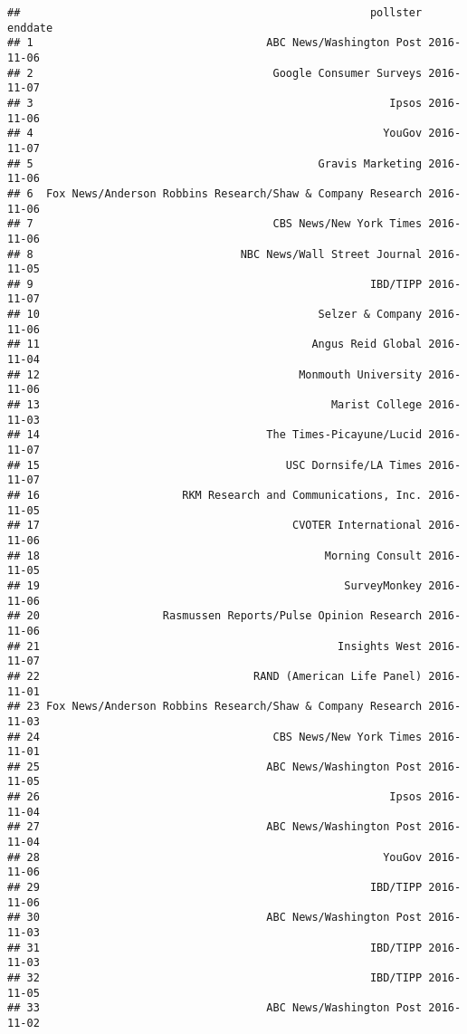 \documentclass[]{article}
\begin{document}
\begin{verbatim}
##                                                      pollster    enddate
## 1                                    ABC News/Washington Post 2016-11-06
## 2                                     Google Consumer Surveys 2016-11-07
## 3                                                       Ipsos 2016-11-06
## 4                                                      YouGov 2016-11-07
## 5                                            Gravis Marketing 2016-11-06
## 6  Fox News/Anderson Robbins Research/Shaw & Company Research 2016-11-06
## 7                                     CBS News/New York Times 2016-11-06
## 8                                NBC News/Wall Street Journal 2016-11-05
## 9                                                    IBD/TIPP 2016-11-07
## 10                                           Selzer & Company 2016-11-06
## 11                                          Angus Reid Global 2016-11-04
## 12                                        Monmouth University 2016-11-06
## 13                                             Marist College 2016-11-03
## 14                                   The Times-Picayune/Lucid 2016-11-07
## 15                                      USC Dornsife/LA Times 2016-11-07
## 16                      RKM Research and Communications, Inc. 2016-11-05
## 17                                       CVOTER International 2016-11-06
## 18                                            Morning Consult 2016-11-05
## 19                                               SurveyMonkey 2016-11-06
## 20                   Rasmussen Reports/Pulse Opinion Research 2016-11-06
## 21                                              Insights West 2016-11-07
## 22                                 RAND (American Life Panel) 2016-11-01
## 23 Fox News/Anderson Robbins Research/Shaw & Company Research 2016-11-03
## 24                                    CBS News/New York Times 2016-11-01
## 25                                   ABC News/Washington Post 2016-11-05
## 26                                                      Ipsos 2016-11-04
## 27                                   ABC News/Washington Post 2016-11-04
## 28                                                     YouGov 2016-11-06
## 29                                                   IBD/TIPP 2016-11-06
## 30                                   ABC News/Washington Post 2016-11-03
## 31                                                   IBD/TIPP 2016-11-03
## 32                                                   IBD/TIPP 2016-11-05
## 33                                   ABC News/Washington Post 2016-11-02

\end{verbatim}
\end{document}
